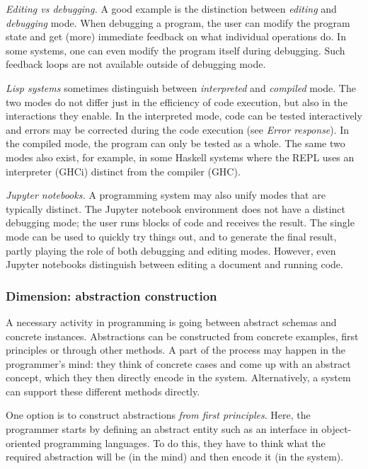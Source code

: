 \documentclass[english,submission]{programming}
\begin{document}
\emph{Editing vs debugging.} A good example is the distinction between
\emph{editing} and \emph{debugging} mode. When debugging a program, the
user can modify the program state and get (more) immediate feedback on
what individual operations do. In some systems, one can even modify the
program itself during debugging. Such feedback loops are not available
outside of debugging mode.

\emph{Lisp systems} sometimes distinguish between \emph{interpreted} and
\emph{compiled} mode. The two modes do not differ just in the efficiency
of code execution, but also in the interactions they enable. In the
interpreted mode, code can be tested interactively and errors may be
corrected during the code execution (see \emph{Error response}). In the
compiled mode, the program can only be tested as a whole. The same two
modes also exist, for example, in some Haskell systems where the REPL
uses an interpreter (GHCi) distinct from the compiler (GHC).

\emph{Jupyter notebooks.} A programming system may also unify modes that
are typically distinct. The Jupyter notebook environment does not have a
distinct debugging mode; the user runs blocks of code and receives the
result. The single mode can be used to quickly try things out, and to
generate the final result, partly playing the role of both debugging and
editing modes. However, even Jupyter notebooks distinguish between
editing a document and running code.

\hypertarget{dimension-abstraction-construction}{%
\subsubsection{Dimension: abstraction
construction}\label{dimension-abstraction-construction}}

A necessary activity in programming is going between abstract schemas
and concrete instances. Abstractions can be constructed from concrete
examples, first principles or through other methods. A part of the
process may happen in the programmer's mind: they think of concrete
cases and come up with an abstract concept, which they then directly
encode in the system. Alternatively, a system can support these
different methods directly.

One option is to construct abstractions \emph{from first principles}.
Here, the programmer starts by defining an abstract entity such as an
interface in object-oriented programming languages. To do this, they
have to think what the required abstraction will be (in the mind) and
then encode it (in the system).
\end{document}
